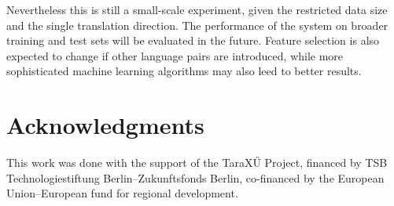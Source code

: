 \documentclass[11pt]{article}
\begin{document}
Nevertheless this is still a small-scale experiment, given the restricted data
size and the single translation direction. The performance of the system on
broader training and test sets will be evaluated in the future. Feature
selection is also expected to change if other language pairs are introduced,
while more sophisticated machine learning algorithms may also leed to better
results. 

\section*{Acknowledgments}
This work was done with the support of the TaraX\H{U } Project, financed by TSB 
Technologiestiftung Berlin--Zukunftsfonds Berlin, co-financed by the European 
Union--European fund for regional development.

 
 

%  
% 
% 
% 
% 
% 
\end{document}
